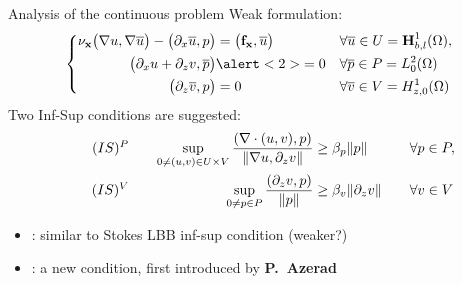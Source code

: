 \begin{frame}{Analysis of the continuous problem}
Weak formulation:
\begin{equation*}
  \left\{
    \begin{aligned}
      \visc_\xx\big(\grad u,\grad\bu\big)
      -\big(\divx\bu, p\big) &= \big(\ff_\xx,\bu\big) && \forall
      \bu\in \UU=\Uspace,
      \\
      \big(\divx \uu + \dz v,\bp\big) & \alert<2>{= 0} &&
      \forall\bp\in \PP=\Pspace
      \\
      \big(\dz \bv, p\big) & =0 &&
      \forall\bv\in \VV=\Vspace
    \end{aligned}
  \right.
\end{equation*}
\pause
Two Inf-Sup conditions are suggested:
\begin{alignat*}{4}
  \label{eq:ISp}
  \tag*{\ensuremath{(IS)^\PP}\xspace}
  &\quad&
  \sup_{0\neq(\uu,\vv)\in \UU \times \VV}
  \frac{(\div(\uu,\vv),\pp)}{\|\grad \uu,\dz \vv\|}
  &\ge \ConstISp \|\pp\|
  &\quad&
  \forall \pp \in \PP,
  \\
  \label{eq:ISv}
  \tag*{\ensuremath{(IS)^\VV}\xspace}
  &\quad &
  \sup_{0\neq \pp \in \PP}
  \frac{(\dz \vv,\pp)}{\|\pp\|}
  &\ge \ConstISv \|\dz\vv\|
  &\quad&
  \forall \vv\in \VV
\end{alignat*}

\begin{remark}
  \begin{itemize}
  \item \ISp: similar to Stokes LBB
    inf-sup condition (weaker?)~\cite{Brezzi-Fortin:91}
  \item \ISv: a new condition, first introduced by
    \textbf{P.~Azerad}~\cite{Azerad:1994,Azerad:PhD:96}
  \end{itemize}
\end{remark}
\bigskip~
\end{frame}

